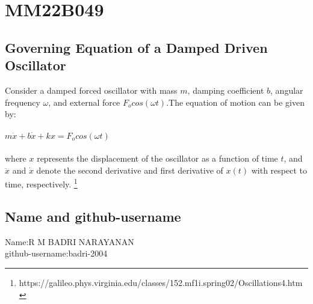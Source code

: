 \documentclass{article}
\begin{document}
\section{MM22B049}
\subsection{Governing Equation of a Damped Driven Oscillator}
Consider a damped forced oscillator with mass $m$, damping coefficient $b$, angular frequency $\omega$, and external force \(F_ocos(\omega t)\).The equation of motion can be given by:\\\\
\textsc{\Large  \(m\ddot{x} + b\dot{x} + kx = F_ocos(\omega t)\)}\\\\

where $x$ represents the displacement of the oscillator as a function of time $t$, and $\ddot{x}$ and $\dot{x}$ denote the second derivative and first derivative of $x(t)$ with respect to time, respectively.
\footnote{https://galileo.phys.virginia.edu/classes/152.mf1i.spring02/Oscillations4.htm}
\subsection{Name and github-username }
Name:R M BADRI NARAYANAN\\
github-username:badri-2004
\end{document}
